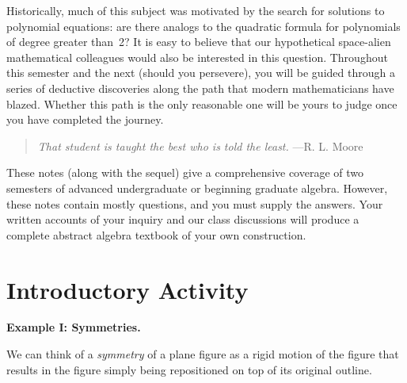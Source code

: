 Historically, much of this subject was motivated by the search for solutions to polynomial equations: are there analogs to the quadratic formula for polynomials of degree greater than~2? It is easy to believe that our hypothetical space-alien mathematical colleagues would also be interested in this question. Throughout this semester and the next (should you persevere), you will be guided through a series of deductive discoveries along the path that modern mathematicians have blazed. Whether this path is the only reasonable one will be yours to judge once you have completed the journey.

\begin{quote}
  \textit{That student is taught the best who is told the least.} ---R. L. Moore
\end{quote}

These notes (along with the sequel) give a comprehensive coverage of two semesters of advanced undergraduate or beginning graduate algebra. However, these notes contain mostly questions, and you must supply the answers. Your written accounts of your inquiry and our class discussions will produce a complete abstract algebra textbook of your own construction.

\mainmatter

\chapter*{Introductory Activity}

\textbf{Example I: Symmetries.}
\begin{annotation}
\end{annotation}

We can think of a \textit{symmetry} of a plane figure as a rigid motion of the figure that results in the figure simply being repositioned on top of its original outline.

